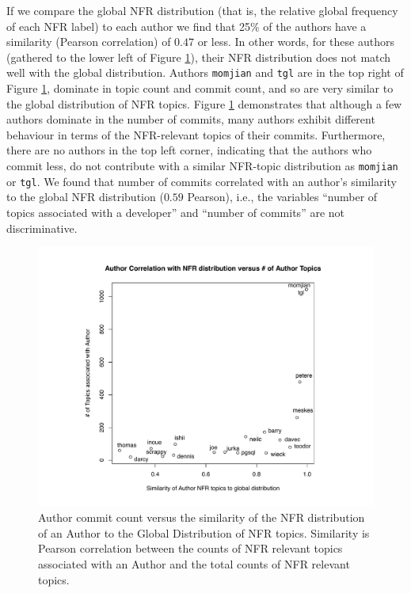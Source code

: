 \documentclass[smallextended]{svjour3}       %
\begin{document}
If we compare the global NFR distribution (that is, the relative global frequency of each NFR label)
to each author we find that 25\%
 of the authors have a similarity (Pearson correlation) of $0.47$ or less. In other words, for these authors (gathered to the lower left of Figure  \ref{fig:authorsim}),
 their NFR distribution does not match well with the global
 distribution.
Authors \texttt{momjian} and \texttt{tgl} are in the top right of
Figure \ref{fig:authorsim}, dominate in topic count and commit count, and so are
    very similar to the global distribution of NFR topics.
Figure \ref{fig:authorsim} demonstrates that although a  few authors dominate in
the number of commits, many authors exhibit different behaviour in
terms of the NFR-relevant topics of their commits. Furthermore, there
are no authors in the top left corner, indicating that the authors who
commit less, do not contribute with a similar NFR-topic distribution
as \texttt{momjian} or \texttt{tgl}.
We found that number of commits correlated with an author's similarity to the
global NFR distribution ($0.59$ Pearson), i.e., the variables ``number of topics associated with a developer'' and ``number of commits'' are not discriminative.


\begin{figure}
  \centering
  \includegraphics[width=.9\textwidth]{figures/author-distance-from-aggregate-manlab}
  \caption{Author commit count versus the similarity of the NFR
    distribution of an Author to the Global Distribution of NFR
    topics. Similarity is Pearson correlation between the counts of
    NFR relevant topics associated with an Author and the total counts
    of NFR relevant topics. }
\label{fig:authorsim}
\end{figure}
\end{document}

